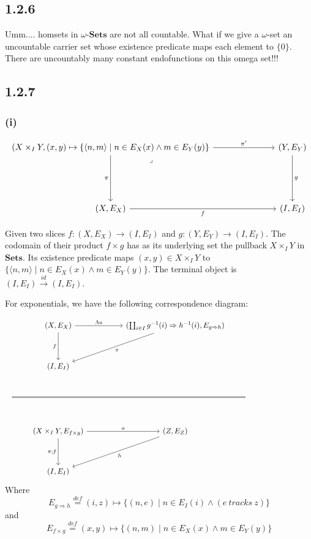 \documentclass{article}
\newcommand{\mbf}{\mathbf}
\newcommand{\defeq}{\overset{\mathit{def}}{=}}
\begin{document}
\subsection*{1.2.6}

Umm.... homsets in $\omega$-$\mbf{Sets}$ are not all countable.
What if we give a $\omega$-set an uncountable carrier set whose existence predicate maps each 
element to $\{ 0 \}$. There are uncountably many constant endofunctions on this omega set!!!
 
\subsection*{1.2.7}

\subsubsection*{(i)}

\[\begin{tikzcd}
	{(X \times_I Y, (x,y) \mapsto \{ \langle n, m \rangle \mid n \in E_X(x) \wedge m \in E_Y(y) \}} &&& {(Y, E_Y)} \\
	\\
	\\
	{(X,E_X)} &&& {(I,E_I)}
	\arrow["f"', from=4-1, to=4-4]
	\arrow["{\pi'}", from=1-1, to=1-4]
	\arrow["g", from=1-4, to=4-4]
	\arrow["\pi"', from=1-1, to=4-1]
	\arrow["\lrcorner"{anchor=center, pos=0.125}, draw=none, from=1-1, to=4-4]
\end{tikzcd}\]

Given two slices $f : (X, E_X) \to (I, E_I)$ and $g : (Y, E_Y) \to (I, E_I)$. The codomain of their product $f \times g$ has as its underlying set the pullback $X \times_I Y$ in $\mathbf{Sets}$.
Its existence predicate maps $(x,y) \in X \times_I Y$ to $\{ \langle n, m \rangle \mid n \in E_X(x) \wedge m \in E_Y(y) \}$. The terminal object is $(I,E_I) \overset{\mathit{id}}{\to} (I, E_I)$.

For exponentials, we have the following correspondence diagram:


\[\begin{tikzcd}
	& {(X,E_X)} && (\coprod_{i \in I} g^{-1}(i) \Rightarrow h^{-1}(i), E_{g \Rightarrow h}) \\
	\\
	& {(I,E_I)} \\
	{} &&& {} & {} &&& {} \\
	{} &&& {} & {} &&& {} \\
	& {(X \times_I Y, E_{f \times g})} && {(Z,E_Z)} \\
	\\
	& {(I, E_I)}
	\arrow["f"', from=1-2, to=3-2]
	\arrow["\pi", from=1-4, to=3-2]
	\arrow["{\Lambda a}", from=1-2, to=1-4]
	\arrow[shift right=5, no head, from=4-1, to=4-5]
	\arrow[shift left=5, no head, from=5-1, to=5-5]
	\arrow["\pi;f" left, from=6-2, to=8-2]
	\arrow["a", from=6-2, to=6-4]
	\arrow["h", from=6-4, to=8-2]
\end{tikzcd}\]
Where $$E_{g \Rightarrow h} \defeq (i,z) \mapsto \{ (n,e) \mid n \in E_I(i) \wedge (e \mathit{~tracks~} z)\}$$
and $$E_{f \times g} \defeq (x,y) \mapsto \{ (n,m) \mid n \in E_X(x) \wedge m \in E_Y(y) \}$$ 
\end{document}
